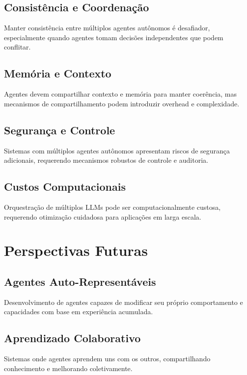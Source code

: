 \documentclass[OA,linenum]{InterPore}
\begin{document}
\subsection{Consistência e Coordenação}

Manter consistência entre múltiplos agentes autônomos é desafiador, especialmente quando agentes tomam decisões independentes que podem conflitar.

\subsection{Memória e Contexto}

Agentes devem compartilhar contexto e memória para manter coerência, mas mecanismos de compartilhamento podem introduzir overhead e complexidade.

\subsection{Segurança e Controle}

Sistemas com múltiplos agentes autônomos apresentam riscos de segurança adicionais, requerendo mecanismos robustos de controle e auditoria.

\subsection{Custos Computacionais}

Orquestração de múltiplos LLMs pode ser computacionalmente custosa, requerendo otimização cuidadosa para aplicações em larga escala.

\section{Perspectivas Futuras}

\subsection{Agentes Auto-Representáveis}

Desenvolvimento de agentes capazes de modificar seu próprio comportamento e capacidades com base em experiência acumulada.

\subsection{Aprendizado Colaborativo}

Sistemas onde agentes aprendem uns com os outros, compartilhando conhecimento e melhorando coletivamente.
\end{document}
